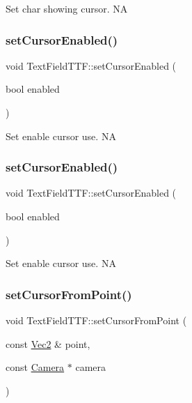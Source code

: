 Set char showing cursor.  NA \mbox{\label{classTextFieldTTF_a831cdc10f96497cf3909457cc4e2380d}} 
\subsubsection{\texorpdfstring{set\+Cursor\+Enabled()}{setCursorEnabled()}\hspace{0.1cm}{\footnotesize\ttfamily [1/2]}}
{\footnotesize\ttfamily void Text\+Field\+T\+T\+F\+::set\+Cursor\+Enabled (\begin{DoxyParamCaption}\item[{bool}]{enabled }\end{DoxyParamCaption})}

Set enable cursor use.  NA \mbox{\label{classTextFieldTTF_a831cdc10f96497cf3909457cc4e2380d}} 
\subsubsection{\texorpdfstring{set\+Cursor\+Enabled()}{setCursorEnabled()}\hspace{0.1cm}{\footnotesize\ttfamily [2/2]}}
{\footnotesize\ttfamily void Text\+Field\+T\+T\+F\+::set\+Cursor\+Enabled (\begin{DoxyParamCaption}\item[{bool}]{enabled }\end{DoxyParamCaption})}

Set enable cursor use.  NA \mbox{\label{classTextFieldTTF_adf65e756901cf94a0875e4b0c8e8a419}} 
\subsubsection{\texorpdfstring{set\+Cursor\+From\+Point()}{setCursorFromPoint()}\hspace{0.1cm}{\footnotesize\ttfamily [1/2]}}
{\footnotesize\ttfamily void Text\+Field\+T\+T\+F\+::set\+Cursor\+From\+Point (\begin{DoxyParamCaption}\item[{const \hyperlink{classVec2}{Vec2} \&}]{point,  }\item[{const \hyperlink{classCamera}{Camera} $\ast$}]{camera }\end{DoxyParamCaption})}

